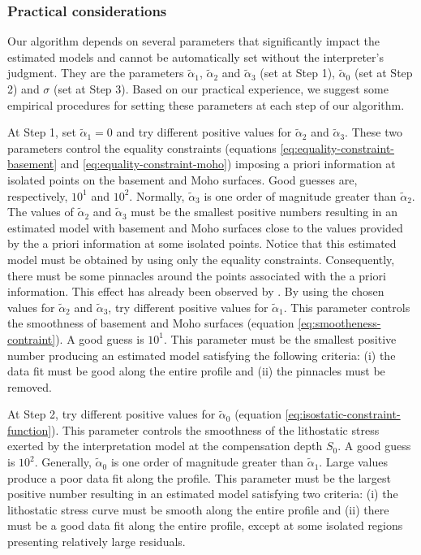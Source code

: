 \documentclass[manuscript]{geophysics}
\begin{document}
\subsubsection*{Practical considerations}

Our algorithm depends on several parameters that significantly impact the estimated models
and cannot be automatically set without the interpreter’s judgment.
They are the parameters $\tilde{\alpha}_{1}$, $\tilde{\alpha}_{2}$ and $\tilde{\alpha}_{3}$
(set at Step 1), $\tilde{\alpha}_{0}$ (set at Step 2) and 
$\sigma$ (set at Step 3).
Based on our practical experience, we suggest
some empirical procedures for setting these parameters at each step of our algorithm.

At Step 1, set $\tilde{\alpha}_{1} = 0$ and try different positive values for 
$\tilde{\alpha}_{2}$ and $\tilde{\alpha}_{3}$. 
These two parameters control the equality constraints
(equations \ref{eq:equality-constraint-basement} and \ref{eq:equality-constraint-moho})
imposing a priori information at isolated points on the basement and Moho surfaces.
Good guesses are, respectively,
$10^{1}$ and $10^{2}$. Normally, $\tilde{\alpha}_{3}$ is one order of magnitude greater
than $\tilde{\alpha}_{2}$.
The values of $\tilde{\alpha}_{2}$ and $\tilde{\alpha}_{3}$ 
must be the smallest positive numbers resulting in an estimated model with
basement and Moho surfaces close to the values provided by the a priori information
at some isolated points. Notice that this estimated model must be obtained 
by using only the equality constraints. Consequently, there must be some
pinnacles around the points associated with the a priori information. This effect
has already been observed by \citet{barbosa-etal1997}.
By using the chosen values for $\tilde{\alpha}_{2}$ and $\tilde{\alpha}_{3}$, 
try different positive values for $\tilde{\alpha}_{1}$. 
This parameter controls the smoothness of basement and Moho surfaces
(equation \ref{eq:smootheness-contraint}).
A good guess is $10^{1}$.
This parameter must be the smallest positive number producing an estimated model
satisfying the following criteria: (i) the data fit must be good along the entire profile
and (ii) the pinnacles must be removed. 

At Step 2, try different positive values for $\tilde{\alpha}_{0}$ 
(equation \ref{eq:isostatic-constraint-function}). This parameter
controls the smoothness of the lithostatic stress exerted by the interpretation model
at the compensation depth $S_{0}$. A good guess is $10^{2}$.
Generally, $\tilde{\alpha}_{0}$ is one order of magnitude greater than
$\tilde{\alpha}_{1}$. Large values produce a poor data fit along the profile.
This parameter must be the largest positive number resulting in an estimated
model satisfying two criteria: (i) the lithostatic stress curve must be smooth
along the entire profile and (ii) there must be a good data fit along the entire
profile, except at some isolated regions presenting relatively large residuals.
\end{document}
